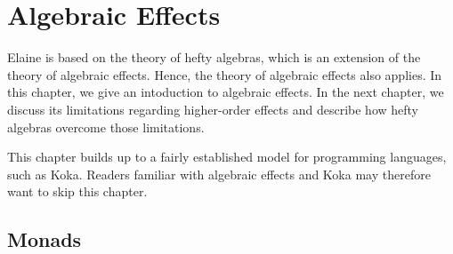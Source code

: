 \chapter{Algebraic Effects}\label{chap:algebraic_effects}

Elaine is based on the theory of hefty algebras, which is an extension of the theory of algebraic effects. Hence, the theory of algebraic effects also applies. In this chapter, we give an intoduction to algebraic effects. In the next chapter, we discuss its limitations regarding higher-order effects and describe how hefty algebras overcome those limitations.

This chapter builds up to a fairly established model for programming languages, such as Koka. Readers familiar with algebraic effects and Koka may therefore want to skip this chapter.

\section{Monads}

%
%
%

